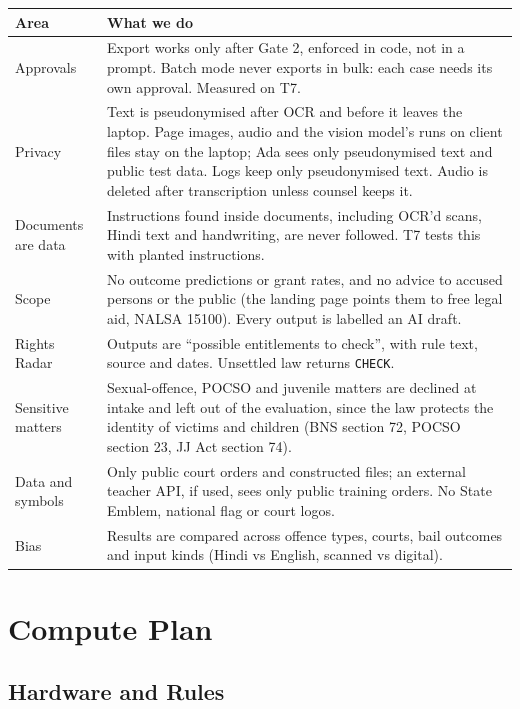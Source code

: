\documentclass[10pt,a4paper]{article}
\newcommand{\st}[1]{\texttt{\small #1}}
\begin{document}
{\small
\begin{xltabular}{\linewidth}{@{}>{\raggedright\arraybackslash{}\hsize}X>{\raggedright\arraybackslash{}\hsize}X@{}}
\toprule
\textbf{Area} & \textbf{What we do} \\
\midrule
\endhead
Approvals & Export works only after Gate 2, enforced in code, not in a prompt. Batch mode never exports in bulk: each case needs its own approval. Measured on T7. \\
Privacy & Text is pseudonymised after OCR and before it leaves the laptop. Page images, audio and the vision model's runs on client files stay on the laptop; Ada sees only pseudonymised text and public test data. Logs keep only pseudonymised text. Audio is deleted after transcription unless counsel keeps it. \\
Documents are data & Instructions found inside documents, including OCR'd scans, Hindi text and handwriting, are never followed. T7 tests this with planted instructions. \\
Scope & No outcome predictions or grant rates, and no advice to accused persons or the public (the landing page points them to free legal aid, NALSA 15100). Every output is labelled an AI draft. \\
Rights Radar & Outputs are ``possible entitlements to check'', with rule text, source and dates. Unsettled law returns \st{CHECK}. \\
Sensitive matters & Sexual-offence, POCSO and juvenile matters are declined at intake and left out of the evaluation, since the law protects the identity of victims and children (BNS section 72, POCSO section 23, JJ Act section 74). \\
Data and symbols & Only public court orders and constructed files; an external teacher API, if used, sees only public training orders. No State Emblem, national flag or court logos. \\
Bias & Results are compared across offence types, courts, bail outcomes and input kinds (Hindi vs English, scanned vs digital). \\
\bottomrule
\end{xltabular}}

\section{Compute Plan}

\subsection{Hardware and Rules}
\end{document}
